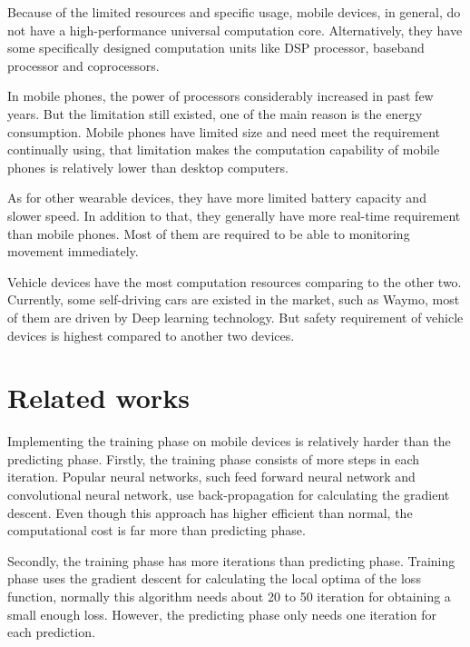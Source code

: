 \documentclass[article]{aaltoseries}
\begin{document}
Because of the limited resources and specific usage, mobile devices, in general, do not have a high-performance 
universal computation core. Alternatively, they have some specifically designed computation units like DSP processor,
baseband processor and coprocessors.

In mobile phones, the power of processors considerably increased in past few years. But the limitation still existed, 
one of the main reason is the energy consumption. Mobile phones have limited size and need meet the requirement continually
using, that limitation makes the computation capability of mobile phones is relatively lower than desktop computers.

As for other wearable devices, they have more limited battery capacity and slower speed. In addition to that, 
they generally have more real-time requirement than mobile phones. Most of them are required to be able to monitoring
movement immediately.

Vehicle devices have the most computation resources comparing to the other two. Currently, some self-driving
cars are existed in the market, such as Waymo, most of them are driven by Deep learning technology. 
But safety requirement of vehicle devices is highest compared to another two devices.  








\section{Related works}
\label{sec:related_works}

Implementing the training phase on mobile devices is relatively harder than the predicting phase.
Firstly, the training phase consists of more steps in each iteration. Popular neural networks, such
feed forward neural network and convolutional neural network, use back-propagation\cite{le1988theoretical}
for calculating the gradient descent. Even though this approach has higher efficient than normal,
the computational cost is far more than predicting phase.

Secondly, the training phase has more iterations than predicting phase. Training phase uses the gradient descent
for calculating the local optima of the loss function, normally this algorithm needs about 20 to 50 iteration
for obtaining a small enough loss. However, the predicting phase only needs one iteration for each prediction.
\end{document}
